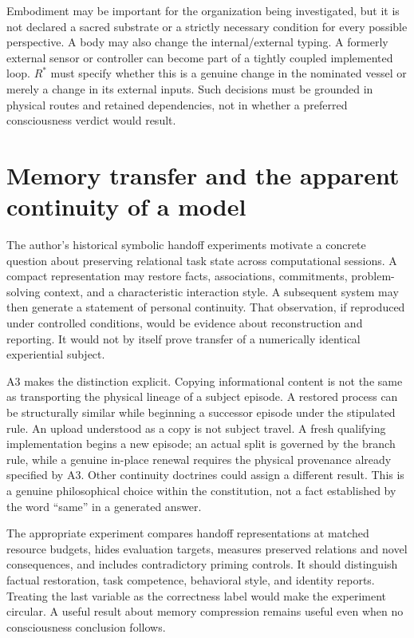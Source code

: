 Embodiment may be important for the organization being investigated, but it is not declared a sacred substrate or a strictly necessary condition for every possible perspective. A body may also change the internal/external typing. A formerly external sensor or controller can become part of a tightly coupled implemented loop. $R^\ast$ must specify whether this is a genuine change in the nominated vessel or merely a change in its external inputs. Such decisions must be grounded in physical routes and retained dependencies, not in whether a preferred consciousness verdict would result.

\section{Memory transfer and the apparent continuity of a model}\label{section:ai:memory-transfer-and-the-apparent-continuity-of-a-model}
The author's historical symbolic handoff experiments motivate a concrete question about preserving relational task state across computational sessions. A compact representation may restore facts, associations, commitments, problem-solving context, and a characteristic interaction style. A subsequent system may then generate a statement of personal continuity. That observation, if reproduced under controlled conditions, would be evidence about reconstruction and reporting. It would not by itself prove transfer of a numerically identical experiential subject.

A3 makes the distinction explicit. Copying informational content is not the same as transporting the physical lineage of a subject episode. A restored process can be structurally similar while beginning a successor episode under the stipulated rule. An upload understood as a copy is not subject travel. A fresh qualifying implementation begins a new episode; an actual split is governed by the branch rule, while a genuine in-place renewal requires the physical provenance already specified by A3. Other continuity doctrines could assign a different result. This is a genuine philosophical choice within the constitution, not a fact established by the word ``same'' in a generated answer.

The appropriate experiment compares handoff representations at matched resource budgets, hides evaluation targets, measures preserved relations and novel consequences, and includes contradictory priming controls. It should distinguish factual restoration, task competence, behavioral style, and identity reports. Treating the last variable as the correctness label would make the experiment circular. A useful result about memory compression remains useful even when no consciousness conclusion follows.

